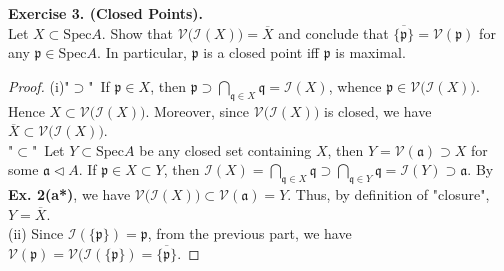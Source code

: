 \documentclass[12pt,a4paper,footinclude=true,headinclude=true]{scrbook} %
\newenvironment{exe}[2][Exercise]
    { \begin{mdframed}[backgroundcolor=gray!20] \textbf{#1 #2.}\\ }
    {  \end{mdframed}}
\begin{document}
\begin{exe}{3. (Closed Points)}
    Let $X\subset\mathrm{Spec}A$. Show that $\mathcal{V(I}(X))=\overline{X}$ and conclude that $\overline{\{\mathfrak{p}\}}=\mathcal{V}(\mathfrak{p})$ for any $\mathfrak{p}\in\mathrm{Spec}A$. In particular, $\mathfrak{p}$ is a closed point iff $\mathfrak{p}$ is maximal. 
\end{exe}
\begin{proof}
    (i)"$\supset$"\ If $\mathfrak{p}\in X$, then $\mathfrak{p}\supset\bigcap_{\mathfrak{q}\in X}\mathfrak{q}=\mathcal{I}(X)$, whence $\mathfrak{p}\in\mathcal{V(I}(X))$. Hence $X\subset\mathcal{V(I}(X))$. Moreover, since $\mathcal{V(I}(X))$ is closed, we have $\overline{X}\subset\mathcal{V(I}(X))$.\\
    "$\subset$"\ Let $Y\subset\mathrm{Spec}A$ be any closed set containing $X$, then $Y=\mathcal{V}(\mathfrak{a})\supset X$ for some $\mathfrak{a}\triangleleft A$. If $\mathfrak{p}\in X\subset Y$, then $\mathcal{I}(X)=\bigcap_{\mathfrak{q}\in X}\mathfrak{q}\supset\bigcap_{\mathfrak{q}\in Y}\mathfrak{q}=\mathcal{I}(Y)\supset\mathfrak{a}$. By \textbf{Ex. 2(a*)}, we have $\mathcal{V(I}(X))\subset\mathcal{V}(\mathfrak{a})=Y$. Thus, by definition of "closure", $Y=\overline{X}$.\\
    (ii) Since $\mathcal{I}(\{\mathfrak{p}\})=\mathfrak{p}$, from the previous part, we have $\mathcal{V}(\mathfrak{p})=\mathcal{V(I}(\{\mathfrak{p}\})=\overline{\{\mathfrak{p}\}}$.
\end{proof}
\end{document}
